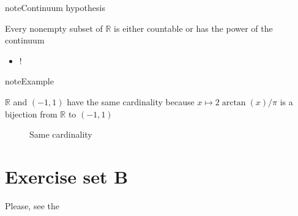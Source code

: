 \documentclass[letterpaper,10pt,english]{jupyterBook}
\begin{document}
\begin{sphinxadmonition}{note}{Continuum hypothesis}

\sphinxAtStartPar
Every nonempty subset of \(\mathbb{R}\) is either
countable or has the power of the continuum
\end{sphinxadmonition}
\begin{itemize}
\item {} 
\sphinxAtStartPar
{}!

\end{itemize}

\begin{sphinxadmonition}{note}{Example}

\sphinxAtStartPar
\(\mathbb{R}\) and \((-1, 1)\) have the same cardinality because \(x \mapsto 2\arctan(x)/\pi\) is a bijection from \(\mathbb{R}\) to \((-1, 1)\)
\end{sphinxadmonition}

\begin{figure}[htbp]
\centering
\capstart

\noindent{}
\caption{Same cardinality}\label{\detokenize{03.set_theory:arctan}}\end{figure}

\sphinxstepscope


\chapter{Exercise set B}
\label{\detokenize{03.exercises:exercise-set-b}}\label{\detokenize{03.exercises::doc}}
\sphinxAtStartPar
Please, see the
{\hyperref[\detokenize{02.exercises::doc}]{}}
\end{document}

